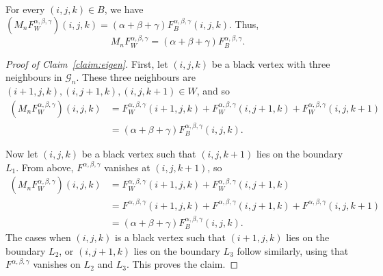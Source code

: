 \documentclass[10pt,a4paper]{amsart}
\begin{document}
\begin{claim}\label{claim:eigen}
For every $(i,j,k)\in B$, we have $(M_nF_W^{\alpha,\beta,\gamma})(i,j,k)=(\alpha+\beta+\gamma)F_B^{\alpha,\beta,\gamma}(i,j,k)$. Thus,
\[M_nF_W^{\alpha,\beta,\gamma}=(\alpha+\beta+\gamma)F_B^{\alpha,\beta,\gamma}.\]
\end{claim}

\begin{proof}[Proof of Claim~\ref{claim:eigen}]
First, let $(i,j,k)$ be a black vertex with three neighbours in $\mathcal{G}_n$. These three neighbours are $(i+1,j,k),(i,j+1,k),(i,j,k+1)\in W$, and so 
\begin{align*}
(M_nF_W^{\alpha,\beta,\gamma})(i,j,k)&=F_W^{\alpha,\beta,\gamma}(i+1,j,k)+F_W^{\alpha,\beta,\gamma}(i,j+1,k)+F_W^{\alpha,\beta,\gamma}(i,j,k+1)\\
&=(\alpha+\beta+\gamma)F_B^{\alpha,\beta,\gamma}(i,j,k).
\end{align*}

Now let $(i,j,k)$ be a black vertex such that $(i,j,k+1)$ lies on the boundary $L_1$. From above, $F^{\alpha,\beta,\gamma}$ vanishes at $(i,j,k+1)$, so
\begin{align*}
(M_nF_W^{\alpha,\beta,\gamma})(i,j,k)&=F_W^{\alpha,\beta,\gamma}(i+1,j,k)+F_W^{\alpha,\beta,\gamma}(i,j+1,k)\\
&=F^{\alpha,\beta,\gamma}(i+1,j,k)+F^{\alpha,\beta,\gamma}(i,j+1,k)+F^{\alpha,\beta,\gamma}(i,j,k+1)\\
&=(\alpha+\beta+\gamma)F_B^{\alpha,\beta,\gamma}(i,j,k).
\end{align*}
The cases when $(i,j,k)$ is a black vertex such that $(i+1,j,k)$ lies on the boundary $L_2$, or $(i,j+1,k)$ lies on the boundary $L_3$ follow similarly, using that $F^{\alpha,\beta,\gamma}$ vanishes on $L_2$ and $L_3$. This proves the claim.
\renewcommand{\qedsymbol}{$\boxdot$}
\end{proof}
\end{document}
